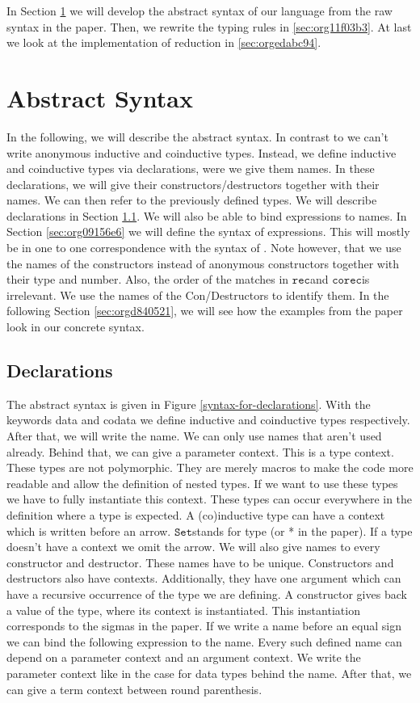 \documentclass[a4paper,cleardoubleempty,BCOR1cm]{scrbook}
\begin{document}
In Section \ref{sec:org153f003} we will develop the abstract syntax of our language
from the raw syntax in the paper. Then, we rewrite the typing rules in \ref{sec:org11f03b3}. At last we look at the implementation of reduction in \ref{sec:orgedabc94}.
\section{Abstract Syntax}
\label{sec:org153f003}
In the following, we will describe the abstract syntax. In contrast to
\cite{basold2016type} we can't write anonymous inductive and coinductive types.
Instead, we define inductive and coinductive types via declarations, were we
give them names. In these declarations, we will give their
constructors/destructors together with their names. We can then refer to
the previously defined types. We will describe declarations in Section
\ref{sec:orga470b6c}. We will also be able to bind expressions to names. In Section
\ref{sec:org09156e6} we will define the syntax of expressions. This will mostly be in
one to one correspondence with the syntax of \cite{basold2016type}. Note
however, that we use the names of the constructors instead of anonymous
constructors together with their type and number. Also, the order of the
matches in $\mathtt{rec}$\;and $\mathtt{corec}$\;is irrelevant. We use the names of the
Con/Destructors to identify them. In the following Section \ref{sec:orgd840521}, we will
see how the examples from the paper look in our concrete syntax.
\subsection{Declarations}
\label{sec:orga470b6c}
The abstract syntax is given in Figure \ref{syntax-for-declarations}. With the
keywords data and codata we define inductive and coinductive types
respectively. After that, we will write the name. We can only use names that
aren't used already. Behind that, we can give a parameter context. This is a
type context. These types are not polymorphic. They are merely macros to make
the code more readable and allow the definition of nested types. If we want
to use these types we have to fully instantiate this context. These types can
occur everywhere in the definition where a type is expected. A (co)inductive
type can have a context which is written before an arrow. $\mathtt{Set}$\;stands for
type (or * in the paper). If a type doesn't have a context we omit the arrow.
We will also give names to every constructor and destructor. These names have
to be unique. Constructors and destructors also have contexts. Additionally,
they have one argument which can have a recursive occurrence of the type we
are defining. A constructor gives back a value of the type, where its
context is instantiated. This instantiation corresponds to the sigmas in the
paper. If we write a name before an equal sign we can bind the following
expression to the name. Every such defined name can depend on a parameter
context and an argument context. We write the parameter context like in the
case for data types behind the name. After that, we can give a term context
between round parenthesis.
\end{document}

